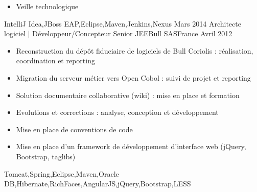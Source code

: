 \begin{experiences}
{\begin{itemize}
                        \item Veille technologique                                                                    
                      \end{itemize}
                    }
                    {IntelliJ Idea,JBoss EAP,Eclipse,Maven,Jenkins,Nexus}
  \emptySeparator
  \experience
    {Mars 2014}     {Architecte logiciel | Développeur/Concepteur Senior JEE}{Bull SAS}{France}
    {Avril 2012}    {
                      \begin{itemize}
                        \item Reconstruction du dépôt fiduciaire de logiciels de Bull Coriolis : réalisation, coordination et reporting
                        \item Migration du serveur métier vers Open Cobol : suivi de projet et reporting                
                        \item Solution documentaire collaborative (wiki) : mise en place et formation                   
                        \item Evolutions et corrections : analyse, conception et développement                          
                        \item Mise en place de conventions de code                                                      
                        \item Mise en place d'un framework de développement d'interface web (jQuery, Bootstrap, taglibs)
                      \end{itemize}
                    }
                    {Tomcat,Spring,Eclipse,Maven,Oracle DB,Hibernate,RichFaces,AngularJS,jQuery,Bootstrap,LESS}
  \emptySeparator
\end{experiences}
